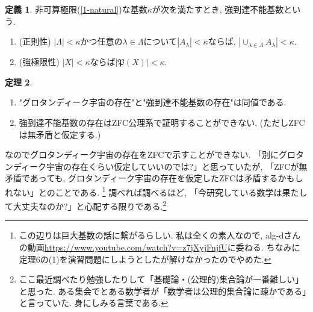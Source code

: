 \documentclass[dvipdfmx,a4paper,11pt]{article}
\theoremstyle{definition}
\newtheorem{thm}{定理}
\newtheorem{dfn}[thm]{定義}
\begin{document}
   \begin{tcolorbox}[
    colback = white,
    colframe = black!35!black,
    fonttitle = \bfseries,
    breakable = true]
    \begin{dfn}
非可算極限(\ref{1-natural})な基数$\kappa$が次を満たすとき, 強到達不能基数という.

\vspace{-13pt}
  \begin{enumerate}[label=(\alph*).]
 \setlength{\parskip}{0cm}
  \setlength{\itemsep}{0pt}
\item (正則性) $|\Lambda|<\kappa$かつ任意の$\lambda \in \Lambda$について$|A_{\lambda}|<\kappa$ならば, $|\cup_{\lambda \in \Lambda}A_{\lambda}|<\kappa$.
\item (強極限性) $|X| < \kappa$ならば$|\mathfrak{P}(X)|<\kappa$.
\end{enumerate}
    \end{dfn}
 \end{tcolorbox}
    \begin{tcolorbox}[
    colback = white,
    colframe = black!35!black,
    fonttitle = \bfseries,
    breakable = true]
    \begin{thm}
  \begin{enumerate}[label=(\arabic*).]
 \setlength{\parskip}{0cm}
  \setlength{\itemsep}{0pt}
\item "グロタンディーク宇宙の存在"と"強到達不能基数の存在"は同値である.
\item 強到達不能基数の存在はZFC公理系で証明することができない. (ただしZFCは無矛盾と仮定する.)
\end{enumerate}
    \end{thm}
 \end{tcolorbox}
 なのでグロタンディーク宇宙の存在をZFCで示すことができない. 
 「別にグロタンディーク宇宙の存在くらい仮定していいのでは?」と思っていたが,  「ZFCが無矛盾であっても, グロタンディーク宇宙の存在を仮定したZFCは矛盾するかもしれない」とのことである. 
 \footnote{この辺りは巨大基数の話に繋がるらしい. 私は全くの素人なので, alg-dさんの動画\url{https://www.youtube.com/watch?v=z7jXyjFnjfU}に委ねる. ちなみに定理6の(1)を演習問題にしようとしたが解けなかったのでやめた.}
調べれば調べるほど, 「今研究している数学は果たして大丈夫なのか?」と心配する限りである.\footnote{ここ最近調べたり勉強したりして「基礎論・(公理的)集合論が一番難しい」と思った. ある集会でとある数学者が「数学者は公理的集合論に疎かである」と言っていた. 身にしみる言葉である.}
 
 
 
 
 \newpage
 
\end{document}
